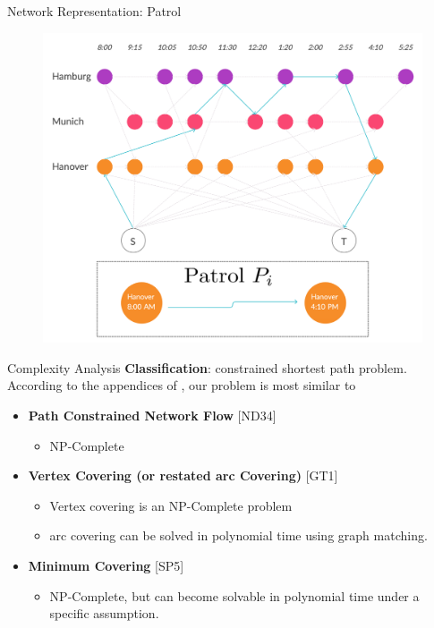 \documentclass[handout]{beamer}
\begin{document}
\begin{frame}{Network Representation: Patrol}
\begin{figure}
    \centering
    \includegraphics[scale=0.10]{Inspector_Path_Patrol.jpg}
\end{figure}
\end{frame}

\begin{frame}{Complexity Analysis}
    \textbf{Classification}: constrained shortest path problem.
   According to the appendices of \cite{Garey:1990:CIG:574848}, our problem is most similar to
   \begin{itemize}
        \item \textbf{Path Constrained Network Flow} [ND34]
        \begin{itemize}
            \item NP-Complete
        \end{itemize}
      
        \item \textbf{Vertex Covering (or restated arc Covering)} [GT1]
        \begin{itemize}
            \item Vertex covering is an NP-Complete problem
            \item arc covering can be solved in polynomial time using graph matching.
        \end{itemize}
        \item \textbf{Minimum Covering} [SP5]
        \begin{itemize}
            \item NP-Complete, but can become solvable in polynomial time under a specific assumption. 
        \end{itemize}
    \end{itemize}
    
\end{frame}
\end{document}

